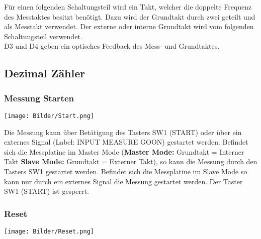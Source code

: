 \documentclass[a4paper,11pt]{scrartcl}
\begin{document}
Für einen folgenden Schaltungsteil wird ein Takt, welcher die doppelte Frequenz des Messtaktes besitzt benötigt. Dazu wird der Grundtakt durch zwei geteilt und als Messtakt verwendet. Der externe oder interne Grundtakt wird vom folgenden Schaltungsteil verwendet.
\\
D3 und D4 geben ein optisches Feedback des Mess- und Grundtaktes. 


\subsection{Dezimal Zähler}

\subsubsection{Messung Starten}

\begin{center}
\texttt{[image: Bilder/Start.png]}
\end{center}

Die Messung kann über Betätigung des Tasters SW1 (START) oder über ein externes Signal (Label: INPUT MEASURE GOON) gestartet werden. Befindet sich die Messplatine im \glqq Master Mode \grqq{} (\textbf{Master Mode:}  Grundtakt = Interner Takt \textbf{Slave Mode:} Grundtakt = Externer Takt), so kann die Messung durch den Tasters SW1 gestartet werden. Befindet sich die Messplatine im \glqq Slave Mode \grqq{} so kann nur durch ein externes Signal die Messung gestartet werden. Der Taster SW1 (START) ist gesperrt.


\subsubsection{Reset}

\begin{center}
\texttt{[image: Bilder/Reset.png]}
\end{center}
\end{document}

